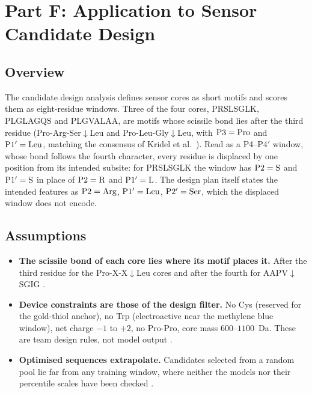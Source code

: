 \section{Part F: Application to Sensor Candidate Design}
\label{sec:design}

\subsection{Overview}

The candidate design analysis defines sensor cores as short motifs and scores
them as eight-residue windows. Three of the four cores, PRSLSGLK, PLGLAGQS and
PLGVALAA, are motifs whose scissile bond lies after the third residue
(Pro-Arg-Ser$\downarrow$Leu and Pro-Leu-Gly$\downarrow$Leu, with $\mathrm{P}3=\mathrm{Pro}$
and $\mathrm{P}1'=\mathrm{Leu}$, matching the consensus of Kridel et al.\ ).
Read as a P4--P4$'$ window, whose bond follows the fourth character, every
residue is displaced by one position from its intended subsite: for PRSLSGLK the
window has $\mathrm{P}2=\mathrm{S}$ and $\mathrm{P}1'=\mathrm{S}$ in place of
$\mathrm{P}2=\mathrm{R}$ and $\mathrm{P}1'=\mathrm{L}$. The design plan itself states the
intended features as $\mathrm{P}2=\mathrm{Arg}$, $\mathrm{P}1'=\mathrm{Leu}$,
$\mathrm{P}2'=\mathrm{Ser}$, which the displaced window does not encode.

\subsection{Assumptions}

\begin{assump}
\begin{itemize}[leftmargin=*,noitemsep]
\item \textbf{The scissile bond of each core lies where its motif places it.}
  After the third residue for the Pro-X-X$\downarrow$Leu cores and after the
  fourth for AAPV$\downarrow$SGIG \FLAG.
\item \textbf{Device constraints are those of the design filter.} No Cys
  (reserved for the gold-thiol anchor), no Trp (electroactive near the methylene
  blue window), net charge $-1$ to $+2$, no Pro-Pro, core mass $600$--$1100$~Da.
  These are team design rules, not model output \CONF.
\item \textbf{Optimised sequences extrapolate.} Candidates selected from a
  random pool lie far from any training window, where neither the models nor
  their percentile scales have been checked \FLAG.
\end{itemize}
\end{assump}

